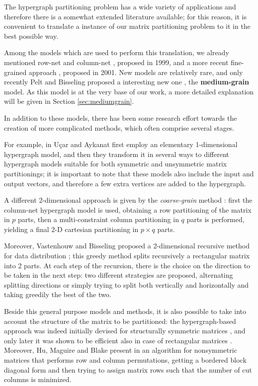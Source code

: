 The hypergraph partitioning problem has a wide variety of applications and therefore there is a somewhat extended literature available; for this reason, it is convenient to translate a instance of our matrix partitioning problem to it in the best possible way. 

Among the models which are used to perform this translation, we already mentioned row-net and column-net \cite{hypergraph_model}, proposed in 1999, and a more recent fine-grained approach \cite{hypergraph_finegrain}, proposed in 2001. New models are relatively rare, and only recently Pelt and Bisseling proposed a interesting new one \cite{mediumgrain}, the \textbf{medium-grain} model. As this model is at the very base of our work, a more detailed explanation will be given in Section \ref{sec:mediumgrain}.

In addition to these models, there has been some research effort towards the creation of more complicated methods, which often comprise several stages.

For example, in \cite{hypergraph_revisiting} Uçar and Aykanat first employ an elementary 1-dimensional hypergraph model, and then they transform it in several ways to different hypergraph models suitable for both symmetric and unsymmetric matrix partitionings; it is important to note that these models also include the input and output vectors, and therefore a few extra vertices are added to the hypergraph.

A different 2-dimensional approach is given by the \emph{coarse-grain} method \cite{hypergraph_coarsegrain}: first the column-net hypergraph model is used, obtaining a row partitioning of the matrix in $p$ parts, then a multi-constraint column partitioning in $q$ parts is performed, yielding a final 2-D cartesian partitioning in $p \times q$ parts. 

Moreover, Vastenhouw and Bisseling proposed a 2-dimensional recursive method for data distribution \cite{mondriaan}; this greedy method splits recursively a rectangular matrix into 2 parts.
At each step of the recursion, there is the choice on the direction to be taken in the next step: two different strategies are proposed, alternating splitting directions or simply trying to split both vertically and horizontally and taking greedily the best of the two.

Beside this general purpose models and methods, it is also possible to take into account the structure of the matrix to be partitioned: the hypergraph-based approach was indeed initially devised for structurally symmetric matrices \cite{hypergraph_model}, and only later it was shown to be efficient also in case of rectangular matrices \cite{pinar1996}. Moreover, Hu, Maguire and Blake present in \cite{hu2000} an algorithm for nonsymmetric matrices that performs row and column permutations, getting a bordered block diagonal form and then trying to assign matrix rows such that the number of cut columns is minimized.

